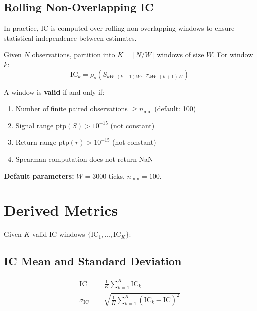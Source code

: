 \documentclass[11pt,a4paper]{article}
\begin{document}
\subsection{Rolling Non-Overlapping IC}

In practice, IC is computed over rolling non-overlapping windows to ensure
statistical independence between estimates.

Given $N$ observations, partition into $K = \lfloor N / W \rfloor$ windows
of size $W$. For window $k$:
\begin{equation}
    \mathrm{IC}_k = \rho_s\!\left(
        S_{kW:(k+1)W},\;
        r_{kW:(k+1)W}
    \right)
    \label{eq:rolling_ic}
\end{equation}

A window is \textbf{valid} if and only if:
\begin{enumerate}    \item Number of finite paired observations $\geq n_{\min}$ (default: 100)
    \item Signal range $\mathrm{ptp}(S) > 10^{-15}$ (not constant)
    \item Return range $\mathrm{ptp}(r) > 10^{-15}$ (not constant)
    \item Spearman computation does not return NaN
\end{enumerate}

\textbf{Default parameters:} $W = 3000$ ticks, $n_{\min} = 100$.

\section{Derived Metrics}

Given $K$ valid IC windows $\{\mathrm{IC}_1, \ldots, \mathrm{IC}_K\}$:

\subsection{IC Mean and Standard Deviation}

\begin{align}
    \overline{\mathrm{IC}} &= \frac{1}{K} \sum_{k=1}^{K} \mathrm{IC}_k
    \label{eq:ic_mean} \\[6pt]
    \sigma_{\mathrm{IC}} &= \sqrt{\frac{1}{K} \sum_{k=1}^{K}
        \left(\mathrm{IC}_k - \overline{\mathrm{IC}}\right)^2}
    \label{eq:ic_std}
\end{align}
\end{document}
